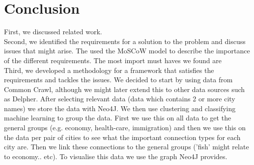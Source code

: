 \section{Conclusion}

First, we discussed related work.  \todo{}
\\

Second, we identified the requirements for a solution to the problem and discuss issues that might arise. The used the MoSCoW model to describe the importance of the different requirements. The most import must haves we found are  \todo{}
\\

Third, we developed a methodology for a framework that satisfies the requirements and tackles the issues. We decided to start by using data from Common Crawl, although we might later extend this to other data sources such as Delpher. After selecting relevant data (data which contains 2 or more city names) we store the data with Neo4J. We then use clustering and classifying machine learning to group the data. First we use this on all data to get the general groups (e.g. economy, health-care, immigration) and then we use this on the data per pair of cities to see what the important connection types for each city are. Then we link these connections to the general groups ('fish' might relate to economy.. etc). To visualise this data we use the graph Neo4J provides.